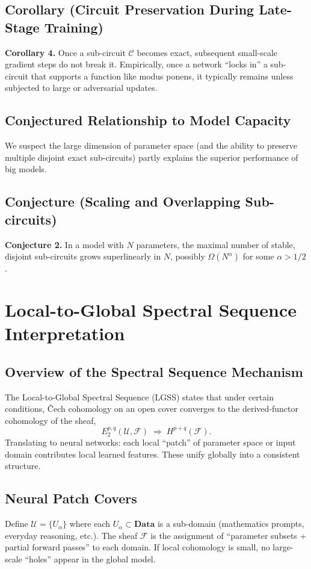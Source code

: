 \documentclass{article}
\begin{document}
\subsection{Corollary (Circuit Preservation During Late-Stage Training)}
\textbf{Corollary 4.}  
Once a sub-circuit $\mathcal{C}$ becomes exact, subsequent small-scale gradient steps do not break it. Empirically, once a network “locks in” a sub-circuit that supports a function like modus ponens, it typically remains unless subjected to large or adversarial updates.

\subsection{Conjectured Relationship to Model Capacity}
We suspect the large dimension of parameter space (and the ability to preserve multiple disjoint exact sub-circuits) partly explains the superior performance of big models.

\subsection{Conjecture (Scaling and Overlapping Sub-circuits)}
\textbf{Conjecture 2.}  
In a model with $N$ parameters, the maximal number of stable, disjoint sub-circuits grows superlinearly in $N$, possibly $\Omega(N^\alpha)$ for some $\alpha>1/2$.

\section{Local-to-Global Spectral Sequence Interpretation}

\subsection{Overview of the Spectral Sequence Mechanism}
The Local-to-Global Spectral Sequence (LGSS) states that under certain conditions, \v{C}ech cohomology on an open cover converges to the derived-functor cohomology of the sheaf,
\[
E_2^{p,q}(\mathcal{U}, \mathcal{F}) \;\Longrightarrow\; H^{p+q}(\mathcal{F}).
\]
Translating to neural networks: each local “patch” of parameter space or input domain contributes local learned features. These unify globally into a consistent structure.

\subsection{Neural Patch Covers}
Define $\mathcal{U} = \{U_\alpha\}$ where each $U_\alpha \subset \mathbf{Data}$ is a sub-domain (mathematics prompts, everyday reasoning, etc.). The sheaf $\mathcal{F}$ is the assignment of “parameter subsets + partial forward passes” to each domain. If local cohomology is small, no large-scale “holes” appear in the global model.
\end{document}
